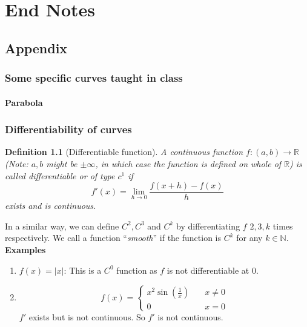 \documentclass[oneside]{book}\twocolumn
\newtheorem{definition}[theorem]{Definition}
\begin{document}
\part{End Notes}
\chapter{Appendix}
\section{Some specific curves taught in class}
\subsection{Parabola}




\section{Differentiability of curves}
\begin{definition}[Differentiable function]
A continuous function $f:(a,b)\to\mathbb R$(\textit{Note:} $a,b$ might be $\pm \infty$, in which case the function is defined on whole of $\mathbb R$) is called differentiable or of type $c^1$ if $$f'(x)=\lim_{h\to 0}\frac{f(x+h)-f(x)}{h}$$
exists and is continuous.
\end{definition}
In a similar way, we can define $C^2,C^3$ and  $C^k$ by differentiating $f$ $2,3,k$ times respectively. We call a function ``\textit{smooth}'' if the function is $C^k$ for any $k\in\mathbb N$.\\
\textbf{Examples}
\begin{enumerate}
    \item $f(x)=|x|$: This is a $C^0$ function as $f$ is not differentiable at 0.
    \item $$f(x)=\begin{cases}x^2\sin\left(\frac{1}{x}\right)\quad&x\ne0\\
    0\quad&x=0
    \end{cases}$$
    $f'$ exists but is not continuous. So $f'$ is not continuous. 
\end{enumerate}
\end{document}
